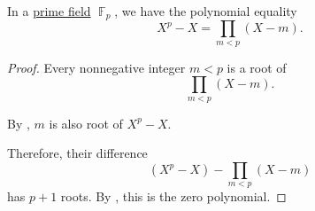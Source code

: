 \begin{lemma}\label{thm:prime_field_all_root_polynomial}
  In a \hyperref[thm:prime_fields]{prime field} \( \BbbF_p \), we have the polynomial equality
  \begin{equation*}
    X^p - X = \prod_{m < p} (X - m).
  \end{equation*}
\end{lemma}
\begin{proof}
  Every nonnegative integer \( m < p \) is a root of
  \begin{equation*}
    \prod_{m < p} (X - m).
  \end{equation*}

  By , \( m \) is also root of \( X^p - X \).

  Therefore, their difference
  \begin{equation*}
    (X^p - X) - \prod_{m < p} (X - m)
  \end{equation*}
  has \( p + 1 \) roots. By , this is the zero polynomial.
\end{proof}

